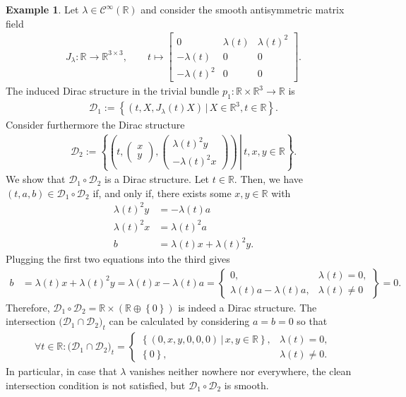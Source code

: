 \documentclass[preprint,12pt]{elsarticle}
\theoremstyle{definition}
\newtheorem{example}[theorem]{Example}
\newcommand{\set}[1]{\left\lbrace #1\right\rbrace}
\begin{document}
\begin{example}\label{ex:sufficient_not_necessary}
Let $\lambda\in\mathcal{C}^\infty(\mathbb{R})$ and consider the smooth antisymmetric matrix field
\begin{align*}
J_{\lambda}:\mathbb{R}\to\mathbb{R}^{3\times 3},\qquad t\mapsto\begin{bmatrix}
0 & \lambda(t) & \lambda(t)^2\\
-\lambda(t) & 0 & 0\\
-\lambda(t)^2 & 0 & 0
\end{bmatrix}.
\end{align*}
The induced Dirac structure in the trivial bundle $p_1:\mathbb{R}\times\mathbb{R}^3\to\mathbb{R}$ is
\begin{align*}
\mathcal{D}_{1} := \set{(t,X,J_{\lambda}(t)X)\,\big\vert\,X\in\mathbb{R}^3,t\in\mathbb{R}}.
\end{align*}
Consider furthermore the Dirac structure
\begin{align*}
\mathcal{D}_{2} := \set{\left.\left(t,\begin{pmatrix}
x\\y
\end{pmatrix},\begin{pmatrix}
\lambda(t)^2y\\-\lambda(t)^2x
\end{pmatrix}\right)\,\right\vert\,t,x,y\in\mathbb{R}}.
\end{align*}
We show that $\mathcal{D}_{1}\circ\mathcal{D}_{2}$ is a Dirac structure. Let $t\in\mathbb{R}$. Then, we have $(t,a,b)\in\mathcal{D}_{1}\circ\mathcal{D}_{2}$ if, and only if, there exists some $x,y\in\mathbb{R}$ with 
\begin{align*}
\lambda(t)^2y & = -\lambda(t)a\\
\lambda(t)^2x & = \lambda(t)^2a\\
b & = \lambda(t)x+\lambda(t)^2y.
\end{align*}
Plugging the first two equations into the third gives
\begin{align*}
b & = \lambda(t)x+\lambda(t)^2y = \lambda(t)x-\lambda(t)a = \left.\begin{cases}
0, & \lambda(t) = 0,\\
\lambda(t)a-\lambda(t)a, & \lambda(t)\neq 0
\end{cases}\right\rbrace = 0.
\end{align*}
Therefore, $\mathcal{D}_{1}\circ\mathcal{D}_{2} = \mathbb{R}\times(\mathbb{R}\oplus\set{0})$ is indeed a Dirac structure. The intersection $\big(\mathcal{D}_1\cap\mathcal{D}_2\big)_t$ can be calculated by considering $a = b = 0$ so that
\begin{align*}
\forall t\in\mathbb{R}: \big(\mathcal{D}_1\cap\mathcal{D}_2\big)_t = \begin{cases}
\set{(0,x,y,0,0,0)\,\big\vert\,x,y\in\mathbb{R}}, & \lambda(t) = 0,\\
\set{0}, & \lambda(t) \neq 0.
\end{cases}
\end{align*}
In particular, in case that $\lambda$ vanishes neither nowhere nor everywhere, the clean intersection condition is not satisfied, but $\mathcal{D}_{1}\circ\mathcal{D}_{2}$ is smooth.


\end{example}
\end{document}
